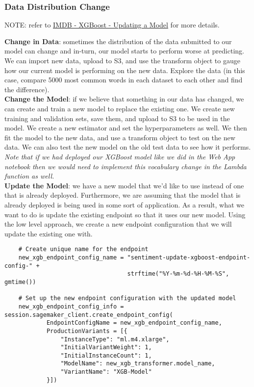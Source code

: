 \documentclass[11pt, a4paper]{article}
\begin{document}
\begin{spacing}{1.1}
	\subsubsection{Data Distribution Change}
	\begin{center}
	\color{darkgray} NOTE: refer to \href{file:///E:/Documents/UdacityNotes/ML\%20Engineer/sample\_code/IMDB\%20-\%20XGBoost\%20-\%20Updating\%20a\%20Model.html}{IMDB - XGBoost - Updating a Model} for more details. \color{black}
	\end{center} \vspace*{1mm}
	\textbf{Change in Data}: sometimes the distribution of the data submitted to our model can change and in-turn, our model starts to perform worse at predicting. We can import new data, upload to S3, and use the transform object to gauge how our current model is performing on the new data. Explore the data (in this case, compare 5000 most common words in each dataset to each other and find the difference).\vspace*{2mm}\\
	\textbf{Change the Model}: if we believe that something in our data has changed, we can create and train a new model to replace the existing one. We create new training and validation sets, save them, and upload to S3 to be used in the model. We create a new estimator and set the hyperparameters as well. We then fit the model to the new data, and use a transform object to test on the new data. We can also test the new model on the old test data to see how it performs.	\textit{Note that if we had deployed our XGBoost model like we did in the Web App notebook then we would need to implement this vocabulary change in the Lambda function as well.} \vspace*{2mm}\\
	\textbf{Update the Model}:  we have a new model that we'd like to use instead of one that is already deployed. Furthermore, we are assuming that the model that is already deployed is being used in some sort of application. As a result, what we want to do is update the existing endpoint so that it uses our new model. Using the low level approach, we create a new endpoint configuration that we will update the existing one with.
	\begin{lstlisting}
	# Create unique name for the endpoint
	new_xgb_endpoint_config_name = "sentiment-update-xgboost-endpoint-config-" + 
	                               strftime("%Y-%m-%d-%H-%M-%S", gmtime())

	# Set up the new endpoint configuration with the updated model
	new_xgb_endpoint_config_info = session.sagemaker_client.create_endpoint_config(
			EndpointConfigName = new_xgb_endpoint_config_name,
			ProductionVariants = [{
				"InstanceType": "ml.m4.xlarge",
				"InitialVariantWeight": 1,
				"InitialInstanceCount": 1,
				"ModelName": new_xgb_transformer.model_name,
				"VariantName": "XGB-Model"
			}])
	

\end{lstlisting}
\end{spacing}
\end{document}
